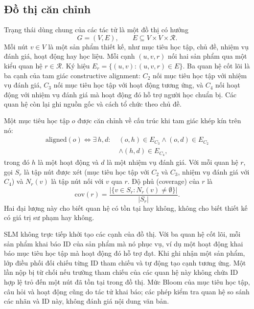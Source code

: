 \documentclass[conference,a4paper]{IEEEtran}
\begin{document}
\subsection{Đồ thị căn chỉnh}
\label{sec:graph}

Trạng thái dùng chung của các tác tử là một đồ thị có hướng
\begin{equation}
\label{eq:graph}
G=(V,E),\qquad E\subseteq V\times V\times\mathcal{R}.
\end{equation}
Mỗi nút $v\in V$ là một sản phẩm thiết kế, như mục tiêu học tập, chủ đề, nhiệm vụ đánh giá,
hoạt động hay học liệu. Mỗi cạnh $(u,v,r)$ nối hai sản phẩm qua một kiểu quan hệ
$r\in\mathcal{R}$. Ký hiệu $E_r=\{(u,v)\colon(u,v,r)\in E\}$. Ba quan hệ cốt lõi là ba cạnh
của tam giác constructive alignment: $C_2$ nối mục tiêu học tập với nhiệm vụ đánh giá, $C_3$
nối mục tiêu học tập với hoạt động tương ứng, và $C_4$ nối hoạt động với nhiệm vụ đánh
giá mà hoạt động đó hỗ trợ người học chuẩn bị.
Các quan hệ còn lại ghi nguồn gốc và cách tổ chức theo chủ đề.

Một mục tiêu học tập $o$ được căn chỉnh về cấu trúc khi tam giác khép kín trên nó:
\begin{equation}
\label{eq:aligned}
\begin{aligned}
\mathrm{aligned}(o)\iff\exists\,h,d\colon\;&(o,h)\in E_{C_3}\wedge(o,d)\in E_{C_2}\\
&\wedge(h,d)\in E_{C_4},
\end{aligned}
\end{equation}
trong đó $h$ là một hoạt động và $d$ là một nhiệm vụ đánh giá. Với mỗi quan hệ $r$, gọi $S_r$ là tập nút được xét (mục tiêu học tập với
$C_2$ và $C_3$, nhiệm vụ đánh giá với $C_4$) và $N_r(v)$ là tập nút nối với $v$ qua $r$. Độ phủ (coverage) của $r$ là
\begin{equation}
\label{eq:coverage}
\mathrm{cov}(r)=\frac{\bigl|\{v\in S_r\colon N_r(v)\neq\emptyset\}\bigr|}{|S_r|}.
\end{equation}
Hai đại
lượng này cho biết quan hệ có tồn tại hay không, không cho biết thiết kế có giá trị sư phạm hay
không.

SLM không trực tiếp khởi tạo các cạnh của đồ thị. Với ba quan hệ cốt lõi, mỗi sản phẩm khai báo ID của sản phẩm mà nó
phục vụ, ví dụ một hoạt động khai báo mục tiêu học tập mà hoạt động đó hỗ trợ đạt. Khi ghi nhận một sản phẩm, lớp điều
phối đối chiếu từng ID tham chiếu và tự động tạo cạnh tương ứng. Một lần nộp bị từ chối
nếu trường tham chiếu của các quan hệ này không chứa ID hợp lệ trỏ đến một nút đã tồn tại trong đồ thị. Mức Bloom của mục tiêu học tập, câu hỏi và hoạt động cũng do tác tử khai báo; các phép kiểm tra quan hệ so
sánh các nhãn và ID này, không đánh giá nội dung văn bản.
\end{document}
